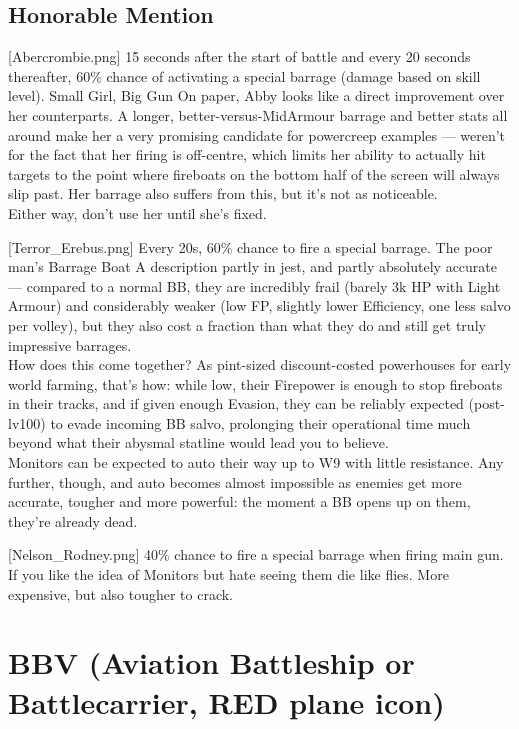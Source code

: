 \newpage
\subsection{ Honorable Mention}
[Abercrombie.png]
{15 seconds after the start of battle and every 20 seconds thereafter, 60\% chance of activating a special barrage (damage based on skill level). }
{Small Girl, Big Gun}
{On paper, Abby looks like a direct improvement over her counterparts. A longer, better-versus-MidArmour barrage and better stats all around make her a very promising candidate for powercreep examples --- weren't for the fact that her firing is off-centre, which limits her ability to actually hit targets to the point where fireboats on the bottom half of the screen will always slip past. Her barrage also suffers from this, but it's not as noticeable.\\
Either way, don't use her until she's fixed.}

[Terror_Erebus.png]
{Every 20s, 60\% chance to fire a special barrage.}
{The poor man's Barrage Boat}
{A description partly in jest, and partly absolutely accurate --- compared to a normal BB, they are incredibly frail (barely 3k HP with Light Armour) and considerably weaker (low FP, slightly lower Efficiency, one less salvo per volley), but they also cost a fraction than what they do and still get truly impressive barrages.\\
How does this come together? As pint-sized discount-costed powerhouses for early world farming, that's how: while low, their Firepower is enough to stop fireboats in their tracks, and if given enough Evasion, they can be reliably expected (post-lv100) to evade incoming BB salvo, prolonging their operational time much beyond what their abysmal statline would lead you to believe.\\
Monitors can be expected to auto their way up to W9 with little resistance. Any further, though, and auto becomes almost impossible as enemies get more accurate, tougher and more powerful: the moment a BB opens up on them, they're already dead.}
 
[Nelson_Rodney.png]
{40\% chance to fire a special barrage when firing main gun.}
{}
{If you like the idea of Monitors but hate seeing them die like flies. More expensive, but also tougher to crack.}
 

 
\newpage
\section[BBV]{BBV (Aviation Battleship or Battlecarrier, RED plane icon)}

